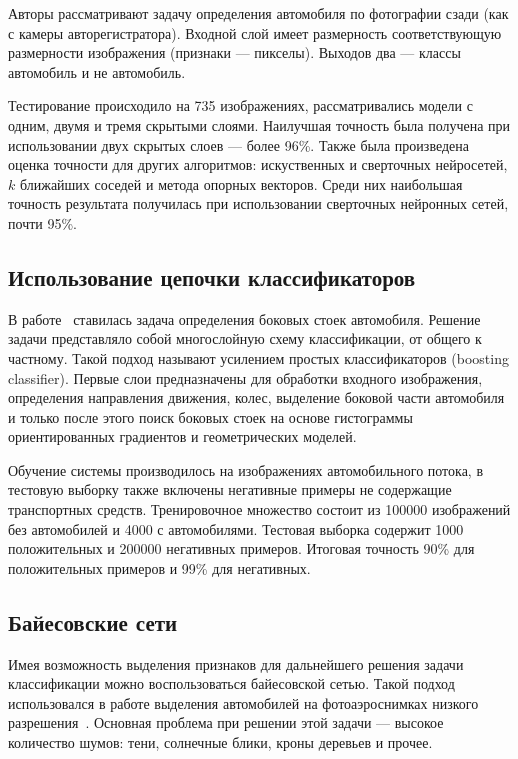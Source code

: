 \documentclass[a4paper,14pt]{extarticle} %
\begin{document}
Авторы рассматривают задачу определения автомобиля по фотографии сзади (как с камеры авторегистратора). Входной слой имеет размерность соответствующую размерности изображения (признаки --- пикселы). Выходов два --- классы автомобиль и не автомобиль.

Тестирование происходило на 735 изображениях, рассматривались модели с одним, двумя и тремя скрытыми слоями. Наилучшая точность была получена при использовании двух скрытых слоев --- более 96\%. Также была произведена оценка точности для других алгоритмов: искуственных и сверточных нейросетей, $k$ ближайших соседей и метода опорных векторов. Среди них наибольшая точность результата получилась при использовании сверточных нейронных сетей, почти 95\%.

\subsection{Использование цепочки классификаторов}
\hspace{\parindent} В работе~\cite{brehar2010pillars} ставилась задача определения боковых стоек автомобиля. Решение задачи представляло собой многослойную схему классификации, от общего к частному. Такой подход называют усилением простых классификаторов (boosting classifier). Первые слои предназначены для обработки входного изображения, определения направления движения, колес, выделение боковой части автомобиля и только после этого поиск боковых стоек на основе гистограммы ориентированных градиентов и геометрических моделей.

Обучение системы производилось на изображениях автомобильного потока, в тестовую выборку также включены негативные примеры не содержащие транспортных средств. Тренировочное множество состоит из 100000 изображений без автомобилей и 4000 с автомобилями. Тестовая выборка содержит 1000 положительных и 200000 негативных примеров. Итоговая точность 90\% для положительных примеров и 99\% для негативных.

\subsection{Байесовские сети} \label{BayesNet}
\hspace{\parindent} Имея возможность выделения признаков для дальнейшего решения задачи классификации можно воспользоваться байесовской сетью. Такой подход использовался в работе выделения автомобилей на фотоаэроснимках низкого разрешения~\cite{zhao2003car}. Основная проблема при решении этой задачи --- высокое количество шумов: тени, солнечные блики, кроны деревьев и прочее.
\end{document}
